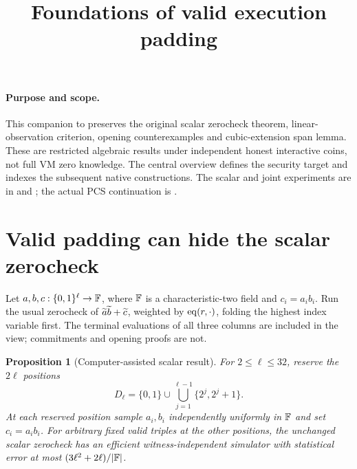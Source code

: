 \documentclass[11pt]{article}
\title{Foundations of valid execution padding}
\author{}
\date{}
\newtheorem{proposition}{Proposition}
\begin{document}
\maketitle
\vspace{-2em}

\paragraph{Purpose and scope.} This companion to  preserves the original scalar zerocheck theorem, linear-observation criterion, opening counterexamples and cubic-extension span lemma. These are restricted algebraic results under independent honest interactive coins, not full VM zero knowledge. The central overview defines the security target and indexes the subsequent native constructions. The scalar and joint experiments are in  and ; the actual PCS continuation is .

\section{Valid padding can hide the scalar zerocheck}

Let $a,b,c:\{0,1\}^{\ell}\to\mathbb{F}$, where $\mathbb{F}$ is a characteristic-two field and $c_i=a_ib_i$. Run the usual zerocheck of $\widetilde{a}\widetilde{b}+\widetilde{c}$, weighted by $\operatorname{eq}(r,\cdot)$, folding the highest index variable first. The terminal evaluations of all three columns are included in the view; commitments and opening proofs are not.

\begin{proposition}[Computer-assisted scalar result]\label{prop:scalar}
For $2\le\ell\le32$, reserve the $2\ell$ positions
\[
 D_\ell=\{0,1\}\cup\bigcup_{j=1}^{\ell-1}\{2^j,2^j+1\}.
\]
At each reserved position sample $a_i,b_i$ independently uniformly in $\mathbb{F}$ and set $c_i=a_ib_i$. For arbitrary fixed valid triples at the other positions, the unchanged scalar zerocheck has an efficient witness-independent simulator with statistical error at most $(3\ell^2+2\ell)/|\mathbb{F}|$.
\end{proposition}
\end{document}
